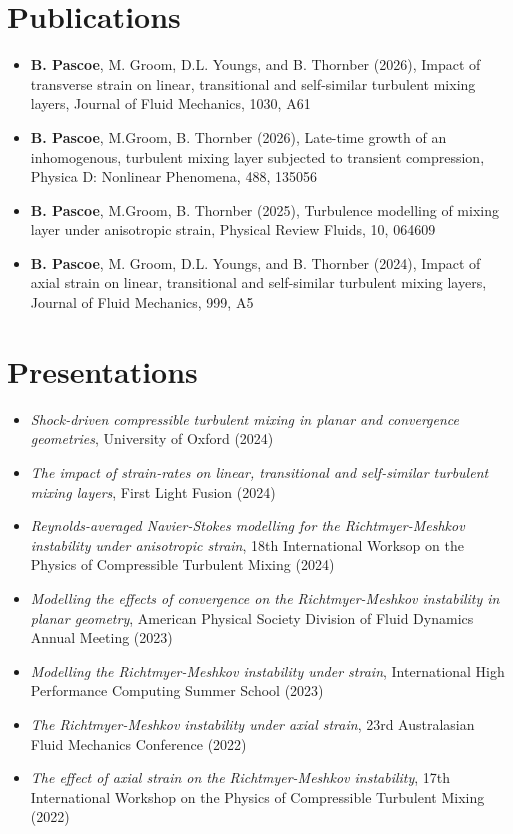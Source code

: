 \documentclass[11pt]{article}       %
\begin{document}
\vspace{-6.5pt}
\section*{Publications}
\begin{itemize}
    \item \textbf{B. Pascoe}, M. Groom, D.L. Youngs, and B. Thornber (2026), Impact of transverse strain on linear, transitional and self-similar turbulent mixing layers, Journal of Fluid Mechanics, 1030, A61
    \item \textbf{B. Pascoe}, M.Groom, B. Thornber (2026), Late-time growth of an inhomogenous, turbulent mixing layer subjected to transient compression, Physica D: Nonlinear Phenomena, 488, 135056
    \item \textbf{B. Pascoe}, M.Groom, B. Thornber (2025), Turbulence modelling of mixing layer under anisotropic strain, Physical Review Fluids, 10, 064609
    \item \textbf{B. Pascoe}, M. Groom, D.L. Youngs, and B. Thornber (2024), Impact of axial strain on linear, transitional and self-similar turbulent mixing layers, Journal of Fluid Mechanics, 999, A5
\end{itemize}

\vspace{-16.5pt}
\section*{Presentations}
\begin{itemize}
\item \textit{Shock-driven compressible turbulent mixing in planar and convergence geometries}, University of Oxford (2024)
\item \textit{The impact of strain-rates on linear, transitional and self-similar turbulent mixing layers}, First Light Fusion (2024)
\item \textit{Reynolds-averaged Navier-Stokes modelling for the Richtmyer-Meshkov instability under anisotropic strain}, 18th International Worksop on the Physics of Compressible Turbulent Mixing (2024)
\item \textit{Modelling the effects of convergence on the Richtmyer-Meshkov instability in planar geometry}, American Physical Society Division of Fluid Dynamics Annual Meeting (2023)
\item \textit{Modelling the Richtmyer-Meshkov instability under strain}, International High Performance Computing Summer School (2023)
\item \textit{The Richtmyer-Meshkov instability under axial strain}, 23rd Australasian Fluid Mechanics Conference (2022)
\item \textit{The effect of axial strain on the Richtmyer-Meshkov instability}, 17th International Workshop on the Physics of Compressible Turbulent Mixing (2022)
\end{itemize}
\end{document}
